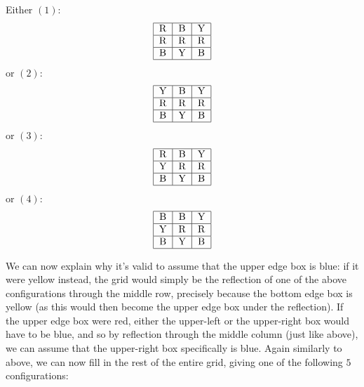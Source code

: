 \begin{enumerate}
 Either $(1)$:
 \[\begin{tabular}{|c|c|c|} \hline R & B & Y \\ \hline R & R & R \\ \hline B & Y & B \\ \hline \end{tabular}\]or $(2)$:
 \[\begin{tabular}{|c|c|c|} \hline Y & B & Y \\ \hline R & R & R \\ \hline B & Y & B \\ \hline \end{tabular}\]or $(3)$:
 \[\begin{tabular}{|c|c|c|} \hline R & B & Y \\ \hline Y & R & R \\ \hline B & Y & B \\ \hline \end{tabular}\]or $(4)$:
 \[\begin{tabular}{|c|c|c|} \hline B & B & Y \\ \hline Y & R & R \\ \hline B & Y & B \\ \hline \end{tabular}\]

 We can now explain why it's valid to assume that the upper edge box is blue: if it were yellow instead, the grid would simply be the reflection of one of the above configurations through the middle row, precisely because the bottom edge box is yellow (as this would then become the upper edge box under the reflection). If the upper edge box were red, either the upper-left or the upper-right box would have to be blue, and so by reflection through the middle column (just like above), we can assume that the upper-right box specifically is blue. Again similarly to above, we can now fill in the rest of the entire grid, giving one of the following $5$ configurations:


\end{enumerate}
